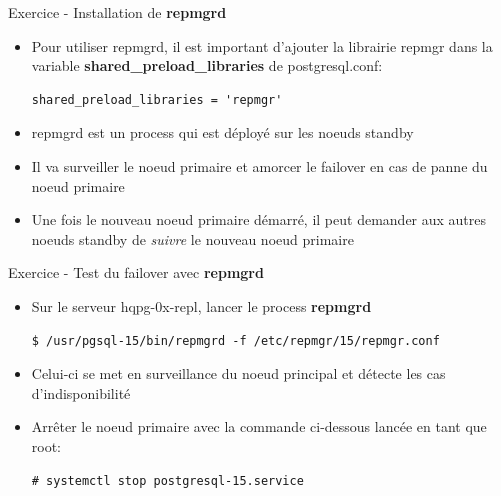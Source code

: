 
\begin{frame}[fragile]{Exercice - Installation de \textbf{repmgrd}}

   \begin{itemize}
      \item Pour utiliser repmgrd, il est important d'ajouter la librairie repmgr dans la variable \textbf{shared\_preload\_libraries} de postgresql.conf:
\begin{tiny}
\begin{Verbatim}[commandchars=\\\{\}]
         shared_preload_libraries = 'repmgr'
\end{Verbatim}
\end{tiny}
      \item repmgrd est un process qui est déployé sur les noeuds standby
      \item Il va surveiller le noeud primaire et amorcer le failover en cas de panne du noeud primaire
      \item Une fois le nouveau noeud primaire démarré, il peut demander aux autres noeuds standby de \textit{suivre} le nouveau noeud primaire
   \end{itemize}

\begin{toile}
\end{toile}

\end{frame}


\begin{frame}[fragile]{Exercice - Test du failover avec \textbf{repmgrd}}

   \begin{itemize}
      \item Sur le serveur hqpg-0x-repl, lancer le process \textbf{repmgrd}
\begin{tiny}
\begin{Verbatim}[commandchars=\&\{\}]
$ /usr/pgsql-15/bin/repmgrd -f /etc/repmgr/15/repmgr.conf
\end{Verbatim}
\end{tiny}
      \item Celui-ci se met en surveillance du noeud principal et détecte les cas d'indisponibilité
      \item Arrêter le noeud primaire avec la commande ci-dessous lancée en tant que root:
\begin{tiny}
\begin{Verbatim}[commandchars=\&\{\}]
# systemctl stop postgresql-15.service
\end{Verbatim}
\end{tiny}
   \end{itemize}

\end{frame}

